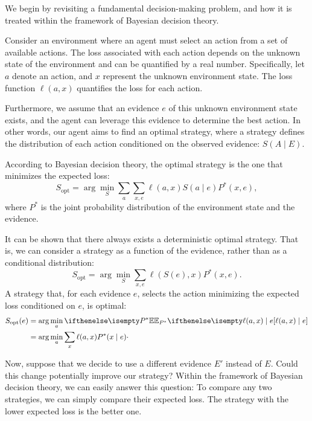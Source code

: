 

\newcommand{\util}[1][a]{\ell(#1, x)}
\newcommand{\envDist}{P^*}
\newcommand{\post}{\pi(x_i \mid \paramVal)}


We begin by revisiting a fundamental decision-making problem, and how it is treated within the framework of Bayesian
decision theory.

Consider an environment where an agent must select an action from a set of available actions.
The loss associated with each action depends on the unknown state of the environment
and can be quantified by a real number.
Specifically, let $a$ denote an action, and $x$ represent the unknown environment state.
The loss function  $\util$ quantifies the loss for each action.

Furthermore, we assume that an evidence $e$ of this unknown environment state exists, and the agent can leverage
this evidence to determine the best action.
In other words, our agent aims to find an optimal strategy, where a strategy defines the distribution of each
action conditioned on the observed evidence: $S(A \mid E)$.

According to Bayesian decision theory, the optimal strategy is the one that minimizes the expected loss:
\begin{equation*}
    S_{\text{opt}} = \arg\min_S\sum_a\sum_{x,e} \util S(a \mid e)\envDist(x, e),
\end{equation*}
where $\envDist$ is the joint probability distribution of the environment state and the evidence.

It can be shown that there always exists a deterministic optimal strategy.
That is, we can consider a strategy as a function of the evidence, rather than as a conditional distribution:
\[
    S_{\text{opt}} = \arg\min_S \sum_{x,e} \util[S(e)] \envDist(x, e).
\]
A strategy that, for each evidence $e$, selects the action minimizing the expected loss conditioned
on $e$, is optimal:
\begin{align}
    \label{eq:bayes-action}
    S_{\text{opt}}(e) &= \arg\min_a \Ex{\envDist}{\util \mid e} \\
    &= \arg\min_a\sum_x \util \envDist(x \mid e) \cdot \nonumber
\end{align}

Now, suppose that we decide to use a different evidence $E'$ instead of $E$.
Could this change potentially improve our strategy?
Within the framework of Bayesian decision theory, we can easily answer this question:
To compare any two strategies, we can simply compare their expected loss.
The strategy with the lower expected loss is the better one.

